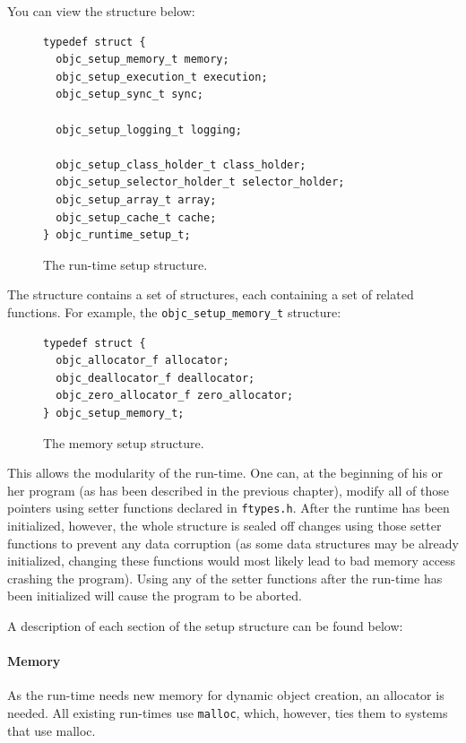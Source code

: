 You can view the structure below:

\begin{figure}[H]
\begin{verbatim}
typedef struct {
  objc_setup_memory_t memory;
  objc_setup_execution_t execution;
  objc_setup_sync_t sync;
  
  objc_setup_logging_t logging;
  
  objc_setup_class_holder_t class_holder;
  objc_setup_selector_holder_t selector_holder;
  objc_setup_array_t array;
  objc_setup_cache_t cache;
} objc_runtime_setup_t;
\end{verbatim}
\centering{}
\caption{The run-time setup structure.}
\label{fig:runtime_setup_structure}
\end{figure}

The structure contains a set of structures, each containing a set of related functions. For example, the \verb=objc_setup_memory_t= structure:

\begin{figure}[H]
\begin{verbatim}
typedef struct {
  objc_allocator_f allocator;
  objc_deallocator_f deallocator;
  objc_zero_allocator_f zero_allocator;
} objc_setup_memory_t;
\end{verbatim}
\centering{}
\caption{The memory setup structure.}
\label{memory_setup_structure}
\end{figure}

This allows the modularity of the run-time. One can, at the beginning of his or her program (as has been described in the previous chapter), modify all of those pointers using setter functions declared in \verb=ftypes.h=. After the runtime has been initialized, however, the whole structure is sealed off changes using those setter functions to prevent any data corruption (as some data structures may be already initialized, changing these functions would most likely lead to bad memory access crashing the program). Using any of the setter functions after the run-time has been initialized will cause the program to be aborted.

A description of each section of the setup structure can be found below:

\paragraph{Memory}

As the run-time needs new memory for dynamic object creation, an allocator is needed. All existing run-times use \verb=malloc=, which, however, ties them to systems that use malloc.

